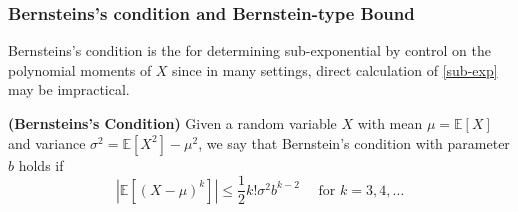 \documentclass{article}
\newcommand{\bfs}[1]{\textbf{({#1})}}
\begin{document}
\subsubsection{Bernsteins's condition and Bernstein-type Bound}\label{ssec:bern_bound}
Bernsteins's condition is the  for determining sub-exponential by control on the polynomial moments of $X$ since in many settings, direct calculation of \cref{sub-exp} may be impractical.
\begin{defa}{\bfs{Bernsteins's Condition}}
Given a random variable $X$ with mean $\mu=\mathbb{E}[X]$ and variance $\sigma^{2}=\mathbb{E}\left[X^{2}\right]-\mu^{2}$, we say that Bernstein's condition with parameter $b$ holds if
$$
\left|\mathbb{E}\left[(X-\mu)^{k}\right]\right| \leq \frac{1}{2} k ! \sigma^{2} b^{k-2} \quad \text { for } k=3,4, \ldots
$$
\end{defa}
\end{document}
